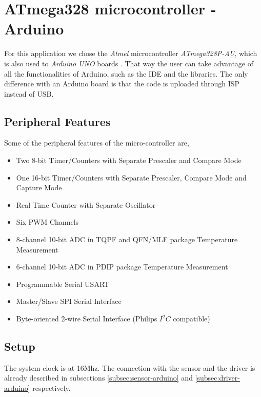 





\section{ATmega328 microcontroller - Arduino} \label{arduino:intro}

For this application we chose the \textit{Atmel} microcontroller \textit{ATmega328P-AU}, which is also used to \textit{Arduino UNO} boards \cite{Arduino}. That way the user can take advantage of all the functionalities of Arduino, such as the IDE and the libraries. The only difference with an Arduino board is that the code is uploaded through ISP instead of USB.

\subsection{Peripheral Features} \label{arduino:features}

Some of the peripheral features of the micro-controller are,

\begin{itemize}
	\item Two 8-bit Timer/Counters with Separate Prescaler and Compare Mode
	\item One 16-bit Timer/Counters with Separate Prescaler, Compare Mode and Capture Mode
	\item Real Time Counter with Separate Oscillator
	\item Six PWM Channels
	\item 8-channel 10-bit ADC in TQPF and QFN/MLF package Temperature Measurement
	\item 6-channel 10-bit ADC in PDIP package Temperature Measurement
	\item Programmable Serial USART
	\item Master/Slave SPI Serial Interface
	\item Byte-oriented 2-wire Serial Interface (Philips $I^2C$ compatible)
\end{itemize}

\subsection{Setup} \label{arduino:setup}

The system clock is at 16Mhz. The connection with the sensor and the driver is already described in subsections \ref{subsec:sensor-arduino} and \ref{subsec:driver-arduino} respectively.

